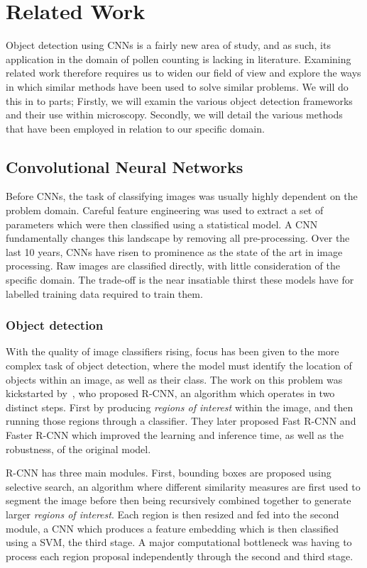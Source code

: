 \chapter{Related Work}\label{cha:related}
Object detection using CNNs is a fairly new area of study, and as such, its application in the domain of pollen counting is lacking in literature.
Examining related work therefore requires us to widen our field of view and explore the ways in which similar methods have been used to solve similar problems.
We will do this in to parts; Firstly, we will examin the various object detection frameworks and their use within microscopy.
Secondly, we will detail the various methods that have been employed in relation to our specific domain.

\section{Convolutional Neural Networks}\label{sec:rel-cnn}
Before CNNs, the task of classifying images was usually highly dependent on the problem domain.
Careful feature engineering was used to extract a set of parameters which were then classified using a statistical model.
A CNN fundamentally changes this landscape by removing all pre-processing.
Over the last 10 years, CNNs have risen to prominence as the state of the art in image processing.
Raw images are classified directly, with little consideration of the specific domain.
The trade-off is the near insatiable thirst these models have for labelled training data required to train them.

\subsection{Object detection}
With the quality of image classifiers rising, focus has been given to the more complex task of object detection, where the model must identify the location of objects within an image, as well as their class.
The work on this problem was kickstarted by~\cite{girshick_rich_2014}, who proposed R-CNN, an algorithm which operates in two distinct steps.
First by producing \textit{regions of interest} within the image, and then running those regions through a classifier.
They later proposed Fast R-CNN and Faster R-CNN which improved the learning and inference time, as well as the robustness, of the original model.

R-CNN has three main modules.
First, bounding boxes are proposed using selective search, an algorithm where different similarity measures are first used to segment the image before then being recursively combined together to generate larger \textit{regions of interest}.
Each region is then resized and fed into the second module, a CNN which produces a feature embedding which is then classified using a SVM, the third stage.
A major computational bottleneck was having to process each region proposal independently through the second and third stage.

